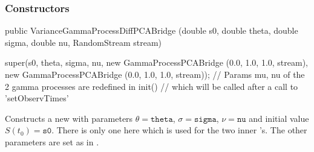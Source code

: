 \subsubsection* {Constructors}
\begin{code}

   public VarianceGammaProcessDiffPCABridge (double s0, double theta,
                                             double sigma, double nu,
                                             RandomStream stream) \begin{hide} {
     super(s0, theta, sigma, nu, 
	  new GammaProcessPCABridge (0.0, 1.0, 1.0, stream),
	  new GammaProcessPCABridge (0.0, 1.0, 1.0, stream));
    // Params mu, nu of the 2 gamma processes are redefined in init()
    // which will be called after a call to 'setObservTimes'
}\end{hide}
\end{code}
\begin{tabb}Constructs a new  with 
parameters  $\theta = \texttt{theta}$, $\sigma = \texttt{sigma}$, $\nu = \texttt{nu}$ 
and initial value $S(t_{0}) = \texttt{s0}$.  There is only
one  here which is
used for the two inner 's.  The other
parameters are set as in .
\end{tabb}

\begin{code}\begin{hide}
}
\end{hide}\end{code}

